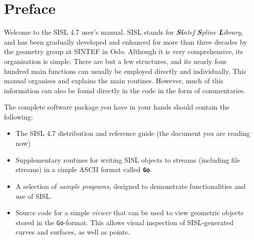 \chapter{Preface}
Welcome to the SISL 4.7 user's manual.  SISL stands for
\emph{\textbf{Si}ntef \textbf{S}pline \textbf{L}ibrary}, and has been gradually 
developed and enhanced for more than three decades by the geometry group at SINTEF in Oslo.
Although it is very comprehensive, its organisation is simple.  There are but a 
few structures, and its nearly four hundred main functions can usually be employed
directly and individually. This manual organises and explains the main routines.  However, much of this
information can also be found directly in the code in the form of commentaries.

The complete software package you have in your hands should contain the following:
\begin{itemize}
\item The SISL 4.7 distribution and reference guide (the document you are reading now)
\item Supplementary routines for writing SISL objects to streams (including file 
streams) in a simple ASCII format called \textbf{\Verb/Go/}.
\item A selection of \emph{sample programs}, designed to demonstrate functionalities
and use of SISL.
\item Source code for a simple \emph{viewer} that can be used to view geometric objects stored
in the \Verb/Go/-format.  This allows visual inspection of SISL-generated curves
and surfaces, as well as points.
\end{itemize}

